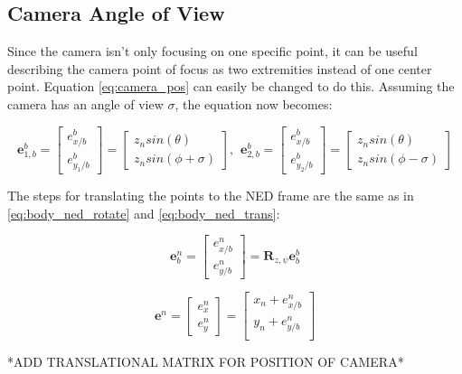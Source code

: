 \subsection{Camera Angle of View}
Since the camera isn't only focusing on one specific point, it can be useful describing the camera point of focus as two extremities instead of one center point. Equation \eqref{eq:camera_pos} can easily be changed to do this. Assuming the camera has an angle of view $\sigma$, the equation now becomes:

\begin{equation}
	\bm{e}_{1,b}^b = 
	\begin{bmatrix}
		e^b_{x/b} \\ e^b_{y_1/b}
	\end{bmatrix}
	=
	\begin{bmatrix}
		z_n sin(\theta)\\
		z_n sin(\phi + \sigma)
	\end{bmatrix}
	, \hspace{5pt}
	\bm{e}_{2,b}^b = 
	\begin{bmatrix}
		e^b_{x/b} \\ e^b_{y_2/b}
	\end{bmatrix}
	=
	\begin{bmatrix}
		z_n sin(\theta)\\
		z_n sin(\phi - \sigma)
	\end{bmatrix}
\end{equation}

The steps for translating the points to the NED frame are the same as in \eqref{eq:body_ned_rotate} and \eqref{eq:body_ned_trans}:

\begin{equation}
	\bm{e}_b^n =
	\begin{bmatrix}
		e^n_{x/b} \\ e^n_{y/b}
	\end{bmatrix}
	= \bm{R}_{z,\psi} \bm{e}_b^b
\end{equation}

\begin{equation}
	\bm{e}^n =
	\begin{bmatrix}
		e^n_{x} \\ e^n_{y}
	\end{bmatrix}
	=
	\begin{bmatrix}
		x_n + e^n_{x/b} \\
		y_n + e^n_{y/b} \\
	\end{bmatrix}
\end{equation}
	
*ADD TRANSLATIONAL MATRIX FOR POSITION OF CAMERA*